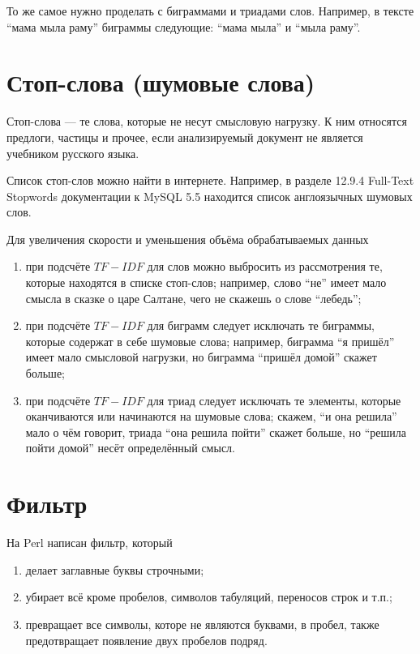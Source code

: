 То же самое нужно проделать с биграммами и триадами слов.
Например, в тексте ``мама мыла раму'' биграммы следующие:
``мама мыла'' и ``мыла раму''.

\section{Стоп-слова (шумовые слова)}
Стоп-слова --- те слова, которые не несут смысловую нагрузку.
К ним относятся предлоги, частицы и прочее,
если анализируемый документ не является учебником русского языка.

Список стоп-слов можно найти в интернете.
Например, в разделе 12.9.4 Full-Text Stopwords документации к MySQL 5.5
находится список англоязычных шумовых слов.

Для увеличения скорости и уменьшения объёма обрабатываемых данных
\begin{enumerate}
  \item
    при подсчёте $TF-IDF$ для слов можно выбросить из рассмотрения те,
    которые находятся в списке стоп-слов;
    например, слово ``не'' имеет мало смысла в сказке о царе Салтане,
    чего не скажешь о слове ``лебедь'';
  \item
    при подсчёте $TF-IDF$ для биграмм следует исключать те биграммы,
    которые содержат в себе шумовые слова;
    например, биграмма ``я пришёл'' имеет мало смысловой нагрузки,
    но биграмма ``пришёл домой'' скажет больше;
  \item
    при подсчёте $TF-IDF$ для триад следует исключать те элементы,
    которые оканчиваются или начинаются на шумовые слова;
    скажем, ``и она решила'' мало о чём говорит,
    триада ``она решила пойти'' скажет больше,
    но ``решила пойти домой'' несёт определённый смысл.
\end{enumerate}

\section{Фильтр}
На Perl написан фильтр, который
\begin{enumerate}
  \item делает заглавные буквы строчными;
  \item убирает всё кроме пробелов, символов табуляций, переносов строк и т.п.;
  \item превращает все символы, которе не являются буквами, в пробел, также
    предотвращает появление двух пробелов подряд.
\end{enumerate}

